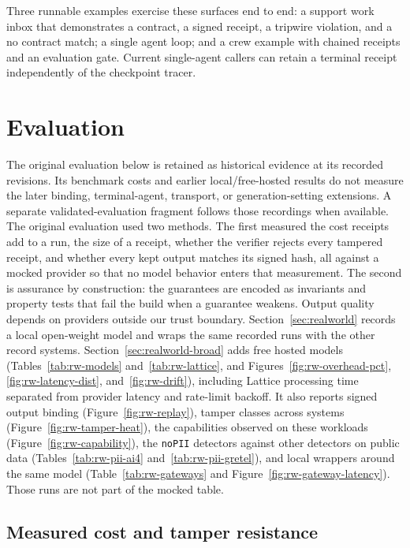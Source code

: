 \documentclass[conference]{IEEEtran}
\newcommand{\code}[1]{\texttt{\small #1}}
\begin{document}
Three runnable examples exercise these surfaces end to end: a support work inbox that
demonstrates a contract, a signed receipt, a tripwire violation, and a no contract
match; a single agent loop; and a crew example with chained receipts and an evaluation
gate. Current single-agent callers can retain a terminal receipt independently of the
checkpoint tracer.

\section{Evaluation}

The original evaluation below is retained as historical evidence at its recorded
revisions. Its benchmark costs and earlier local/free-hosted results do not measure
the later binding, terminal-agent, transport, or generation-setting extensions. A
separate validated-evaluation fragment follows those recordings when available.
The original evaluation used two methods. The first measured the cost receipts add to a
run, the size of a receipt, whether the verifier rejects every tampered receipt, and
whether every kept output matches its signed hash, all against a mocked provider so that
no model behavior enters that measurement. The second is assurance by construction: the
guarantees are encoded as invariants and property tests that fail the build when a
guarantee weakens. Output quality depends on providers outside our trust boundary.
Section~\ref{sec:realworld} records a local open-weight model and wraps the same
recorded runs with the other record systems. Section~\ref{sec:realworld-broad} adds free
hosted models (Tables~\ref{tab:rw-models} and~\ref{tab:rw-lattice}, and
Figures~\ref{fig:rw-overhead-pct}, \ref{fig:rw-latency-dist}, and~\ref{fig:rw-drift}),
including Lattice processing time separated from provider latency and rate-limit
backoff. It also reports signed output binding (Figure~\ref{fig:rw-replay}), tamper
classes across systems (Figure~\ref{fig:rw-tamper-heat}), the capabilities observed on
these workloads (Figure~\ref{fig:rw-capability}), the \code{noPII} detectors against
other detectors on public data (Tables~\ref{tab:rw-pii-ai4} and~\ref{tab:rw-pii-gretel}),
and local wrappers around the same model (Table~\ref{tab:rw-gateways} and
Figure~\ref{fig:rw-gateway-latency}). Those runs are not part of the mocked table.

\subsection{Measured cost and tamper resistance}
\end{document}
